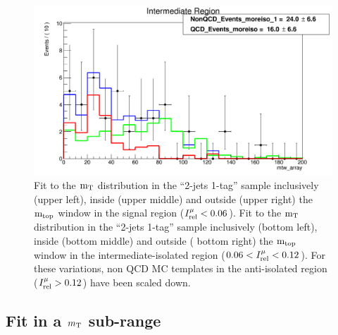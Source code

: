 {\begin{figure}[h!]
{\begin{centering}
\includegraphics[scale=0.2]{figures/2J1T/MTW_fit_2j1t_moreiso_SB_nonQCDMCTemplatesScaledDown}
\par\end{centering}
}
\caption{Fit to the ${\rm m_{T}}$ distribution in the \textquotedblleft{}2-jets
1-tag\textquotedblright{} sample inclusively (upper left), inside
(upper middle) and outside (upper right) the ${\rm m_{top}}$ window in
the signal region ($I_{\rm rel}^{\mu} < 0.06$). Fit to the ${\rm m_{T}}$ distribution in the
\textquotedblleft{}2-jets 1-tag\textquotedblright{} sample inclusively
(bottom left), inside (bottom middle) and outside ( bottom right) the ${\rm m_{top}}$
window in the intermediate-isolated region ($0.06 < I_{\rm rel}^{\mu} < 0.12$). For these variations,
non QCD MC templates in the anti-isolated region ($I_{\rm rel}^{\mu} > 0.12$) have been scaled
down.}
\end{figure}

\clearpage

\subsection{Fit in a $m_{\mathrm{\rm T}}$ sub-range}

}
